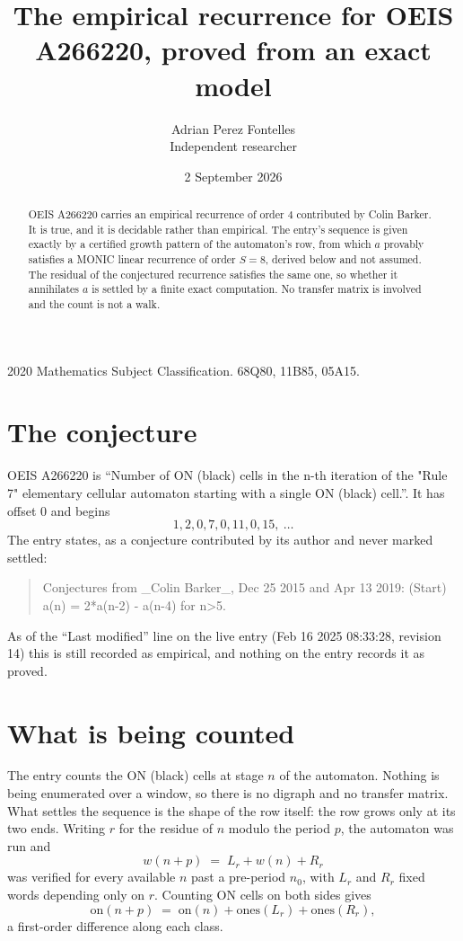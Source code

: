 \documentclass[11pt,a4paper]{article}
\title{The empirical recurrence for OEIS A266220, proved from an exact model}
\author{Adrian Perez Fontelles\\ \small Independent researcher}
\date{2 September 2026}
\theoremstyle{plain}
\theoremstyle{definition}
\begin{document}
\maketitle

\begin{abstract}
OEIS A266220 carries an empirical recurrence of order $4$ contributed by Colin Barker. It is true, and it is
decidable rather than empirical. The entry's sequence is given exactly by a certified growth pattern of the automaton's row, from
which $a$ provably satisfies a MONIC linear recurrence of order $S=8$, derived below and not
assumed. The residual of the conjectured recurrence satisfies the same one, so whether it
annihilates $a$ is settled by a finite exact computation. No transfer matrix is involved and
the count is not a walk.
\end{abstract}

\noindent\small 2020 Mathematics Subject Classification. 68Q80, 11B85, 05A15.\normalsize

\section{The conjecture}

OEIS A266220 is ``Number of ON (black) cells in the n-th iteration of the "Rule 7" elementary cellular automaton starting with a single ON (black) cell.''. It has offset $0$ and begins
\[
1, 2, 0, 7, 0, 11, 0, 15,\ \dots
\]
The entry states, as a conjecture contributed by its author and never marked settled:
\begin{quote}
Conjectures from \_Colin Barker\_, Dec 25 2015 and Apr 13 2019: (Start) a(n) = 2*a(n-2) - a(n-4) for n>5.
\end{quote}
As of the ``Last modified'' line on the live entry (Feb 16 2025 08:33:28, revision 14)
this is still recorded as empirical, and nothing on the entry records it as proved.

\section{What is being counted}

The entry counts the ON (black) cells at stage $n$ of the automaton. Nothing is being enumerated over a window, so there is
no digraph and no transfer matrix. What settles the sequence is the shape of the row itself:
the row grows only at its two ends. Writing
$r$ for the residue of $n$ modulo the period $p$, the automaton was run and
\[
w(n+p)\;=\;L_r + w(n) + R_r
\]
was verified for every available $n$ past a
pre-period $n_0$, with $L_r$ and $R_r$ fixed words depending only on $r$. Counting ON cells on
both sides gives
\[
\mathrm{on}(n+p)\;=\;\mathrm{on}(n)+\mathrm{ones}(L_r)+\mathrm{ones}(R_r),
\]
a first-order difference along each class.
\end{document}
